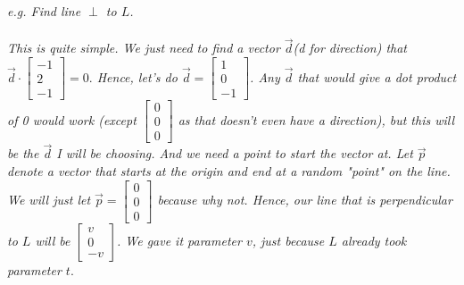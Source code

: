 \documentclass[addpoints]{exam}
\begin{document}
\textit{
e.g. Find line $\perp$ to $L$.\\\\
This is quite simple. We just need to find a vector $\vec{d}$(d for direction) that $\vec{d}\cdot\begin{bmatrix}
    -1\\2\\-1
\end{bmatrix}=0.$ Hence, let's do $\vec{d}=\begin{bmatrix}
    1\\0\\-1
\end{bmatrix}$. Any $\vec{d}$ that would give a dot product of 0 would work (except $\begin{bmatrix}
    0\\0\\0
\end{bmatrix}$ as that doesn't even have a direction), but this will be the $\vec{d}$ I will be choosing. And we need a point to start the vector at. Let $\vec{p}$ denote a vector that starts at the origin and end at a random "point" on the line. We will just let $\vec{p}=\begin{bmatrix}
    0\\0\\0
\end{bmatrix}$ because why not. Hence, our line that is perpendicular to $L$ will be $\begin{bmatrix}
    v\\0\\-v
\end{bmatrix}$. We gave it parameter $v$, just because $L$ already took parameter $t.$ 
}
\end{document}
